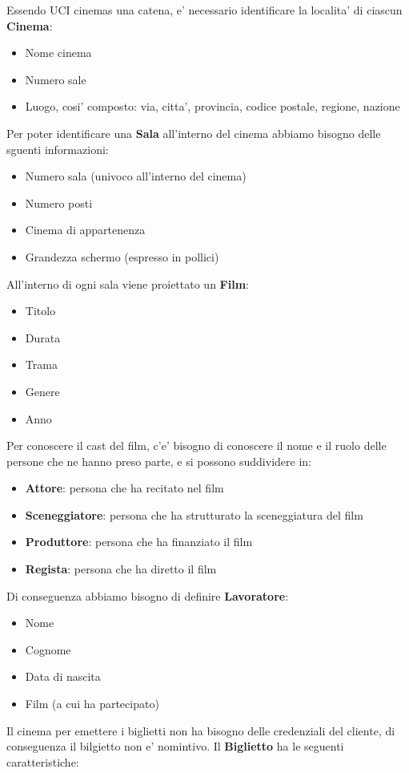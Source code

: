 \documentclass[10pt]{article}
\begin{document}
	Essendo UCI cinemas una catena, e' necessario identificare la localita' di ciascun {\bf Cinema}:
	\begin{itemize}
		\item Nome cinema
		\item Numero sale
		\item Luogo, cosi' composto: via, citta', provincia, codice postale, regione, nazione
	\end{itemize}
	Per poter identificare una {\bf Sala} all'interno del cinema abbiamo bisogno delle sguenti informazioni:
	\begin{itemize}
		\item Numero sala (univoco all'interno del cinema)
		\item Numero posti
		\item Cinema di appartenenza
		\item Grandezza schermo (espresso in pollici)
	\end{itemize}
	All'interno di ogni sala viene proiettato un {\bf Film}:
	\begin{itemize}
		\item Titolo
		\item Durata
		\item Trama
		\item Genere
		\item Anno
	\end{itemize}
	Per conoscere il cast del film, c'e' bisogno di conoscere il nome e il ruolo delle persone che ne hanno preso parte, e si possono suddividere in:
	\begin{itemize}
		\item {\bf Attore}: persona che ha recitato nel film 
		\item {\bf Sceneggiatore}: persona che ha strutturato la sceneggiatura del film 
		\item {\bf Produttore}: persona che ha finanziato il film 
		\item {\bf Regista}: persona che ha diretto il film
	\end{itemize}		 
	Di conseguenza abbiamo bisogno di definire {\bf Lavoratore}:
	\begin{itemize}
		\item Nome
		\item Cognome
		\item Data di nascita
		\item Film (a cui ha partecipato)
	\end{itemize}
	Il cinema per emettere i biglietti non ha bisogno delle credenziali del cliente, di conseguenza il bilgietto non e' nomintivo. Il {\bf Biglietto} ha le seguenti caratteristiche:
\end{document}
